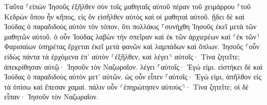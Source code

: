 \documentclass{openreader}
\begin{document}
Ταῦτα ⸀εἰπὼν Ἰησοῦς ἐξῆλθεν σὺν τοῖς μαθηταῖς αὐτοῦ πέραν τοῦ χειμάρρου ⸀τοῦ Κεδρὼν ὅπου ἦν κῆπος, εἰς ὃν εἰσῆλθεν αὐτὸς καὶ οἱ μαθηταὶ αὐτοῦ. 
ᾔδει δὲ καὶ Ἰούδας ὁ παραδιδοὺς αὐτὸν τὸν τόπον, ὅτι πολλάκις ⸀συνήχθη Ἰησοῦς ἐκεῖ μετὰ τῶν μαθητῶν αὐτοῦ. 
ὁ οὖν Ἰούδας λαβὼν τὴν σπεῖραν καὶ ἐκ τῶν ἀρχιερέων καὶ ⸂ἐκ τῶν⸃ Φαρισαίων ὑπηρέτας ἔρχεται ἐκεῖ μετὰ φανῶν καὶ λαμπάδων καὶ ὅπλων. 
Ἰησοῦς ⸀οὖν εἰδὼς πάντα τὰ ἐρχόμενα ἐπ’ αὐτὸν ⸂ἐξῆλθεν, καὶ λέγει⸃ αὐτοῖς· Τίνα ζητεῖτε; 
ἀπεκρίθησαν αὐτῷ· Ἰησοῦν τὸν Ναζωραῖον. λέγει ⸀αὐτοῖς· Ἐγώ εἰμι. εἱστήκει δὲ καὶ Ἰούδας ὁ παραδιδοὺς αὐτὸν μετ’ αὐτῶν. 
ὡς οὖν εἶπεν ⸀αὐτοῖς· Ἐγώ εἰμι, ἀπῆλθον εἰς τὰ ὀπίσω καὶ ἔπεσαν χαμαί. 
πάλιν οὖν ⸂ἐπηρώτησεν αὐτούς⸃· Τίνα ζητεῖτε; οἱ δὲ εἶπαν· Ἰησοῦν τὸν Ναζωραῖον. 
\end{document}
